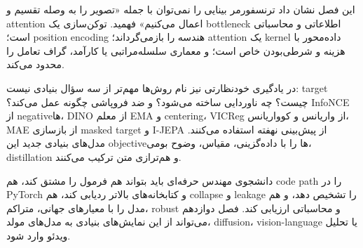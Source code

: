 \documentclass[12pt,openany,oneside]{book}
\begin{document}
\begin{summarybox}
این فصل نشان داد ترنسفورمر بینایی را نمی‌توان با جمله «تصویر را به وصله تقسیم و attention اعمال می‌کنیم» فهمید. توکن‌سازی یک bottleneck اطلاعاتی و محاسباتی است؛ position encoding هندسه را بازمی‌گرداند؛ attention یک kernel داده‌محور با هزینه و شرطی‌بودن خاص است؛ و معماری سلسله‌مراتبی یا کارآمد، گراف تعامل را محدود می‌کند.

در یادگیری خودنظارتی نیز نام روش‌ها مهم‌تر از سه سؤال بنیادی نیست: target چیست؟ چه ناوردایی ساخته می‌شود؟ و ضد فروپاشی چگونه عمل می‌کند؟ InfoNCE از negativeها، DINO از معلم EMA و centering، VICReg از واریانس و کوواریانس، MAE از بازسازی masked target و I-JEPA از پیش‌بینی نهفته استفاده می‌کنند. مدل‌های بنیادی جدید این objectiveها را با داده‌گزینی، مقیاس، وضوح بومی، distillation و هم‌ترازی متن ترکیب می‌کنند.

دانشجوی مهندس حرفه‌ای باید بتواند هم فرمول را مشتق کند، هم code path را در PyTorch و کتابخانه‌های بالاتر ردیابی کند، هم collapse و leakage را تشخیص دهد، و هم مدل را با معیارهای جهانی، متراکم، robust و محاسباتی ارزیابی کند. فصل دوازدهم می‌تواند از این نمایش‌های بنیادی به مدل‌های مولد، diffusion، vision-language یا تحلیل ویدئو وارد شود.
\end{summarybox}
\end{document}
